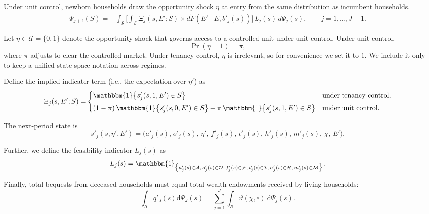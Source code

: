 \documentclass[parskip=full]{article}
\begin{document}
\noindent Under unit control, newborn households draw the opportunity shock $\eta$ at entry from the same distribution as incumbent households.
\begin{equation}\label{eq:lom2}
\begin{aligned}
\Psi_{j+1}(S)={}&\int_{\mathcal{S}}\Bigg[\int_{\mathcal{E}}
\Xi_j(s,E';S)\times d\tilde F\!\left(E' \mid E,b'_j(s)\right)\Bigg]\,L_j(s)\, d\Psi_j(s),\qquad j=1,\ldots,J-1.
\end{aligned}
\end{equation}

\noindent Let $\eta\in\mathcal{U}=\{0,1\}$ denote the opportunity shock that governs access to a controlled unit under unit control. Under unit control,
\[
\Pr(\eta=1)=\pi,
\]
where $\pi$ adjusts to clear the controlled market. Under tenancy control, $\eta$ is irrelevant, so for convenience we set it to $1$. We include it only to keep a unified state-space notation across regimes.

\noindent Define the implied indicator term (i.e., the expectation over $\eta'$) as
\begin{equation}\label{eq:Xi_def}
\Xi_j(s,E';S)=\begin{cases}
\mathbbm{1}\!\left\{ s'_j(s,1,E') \in S \right\}
& \text{under tenancy control},\\[0.35em]
(1-\pi)\,\mathbbm{1}\!\left\{ s'_j(s,0,E') \in S \right\}
+\pi\,\mathbbm{1}\!\left\{ s'_j(s,1,E') \in S \right\}
& \text{under unit control}.
\end{cases}
\end{equation}

\noindent The next-period state is
\begin{equation}\label{eq:sprime}
s'_j(s,\eta',E')=\bigl(a'_j(s),\,o'_j(s),\,\eta',\,f'_j(s),\,\iota'_j(s),\,h'_j(s),\,m'_j(s),\,\chi,\,E'\bigr).
\end{equation}

\noindent Further, we define the feasibility indicator $L_j(s)$ as
\begin{equation}\label{eq:Lj}
L_j(s)=\mathbbm{1}_{\bigl\{a'_j(s)\in \mathcal{A},\,o'_j(s)\in \mathcal{O},\,f'_j(s)\in \mathcal{F},\,\iota'_j(s)\in \mathcal{I},\,
h'_j(s)\in \mathcal{H},\,m'_j(s)\in \mathcal{M}\bigr\}}.
\end{equation}

Finally, total bequests from deceased households must equal total wealth endowments received by living households:
\begin{equation}\label{market_clearing:agg_bequests}
    \int_{\mathcal{S}} q'_{J}(s) \mathrm{d}\Psi_{J}(s) = \sum_{j=1}^J \int_{\mathcal{S}} \vartheta (\chi,e)\ \mathrm{d}\Psi_j(s).
\end{equation}
\end{document}
